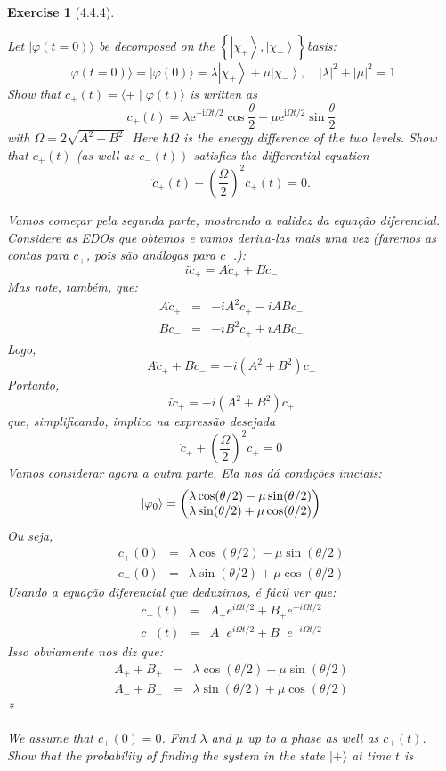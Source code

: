 \documentclass[12pt]{article}
\def\be{\begin{equation}}
\def\ee{\end{equation}}
\def\bea{\begin{eqnarray*}}
\def\eea{\end{eqnarray*}}
\def\f{\frac}
\def\l{\left}
\def\r{\right}
\newtheorem{exercise}{Exercise}
\begin{document}
\begin{exercise}[4.4.4]
\begin{exercises}
		\item Let $|\varphi(t=0)\rangle$ be decomposed on the $\left\{\left|\chi_{+}\right\rangle,\left|\chi_{-}\right\rangle\right\}$basis:
		$$
		|\varphi(t=0)\rangle=|\varphi(0)\rangle=\lambda\left|\chi_{+}\right\rangle+\mu\left|\chi_{-}\right\rangle, \quad|\lambda|^{2}+|\mu|^{2}=1
		$$
		Show that $c_{+}(t)=\langle+\mid \varphi(t)\rangle$ is written as
		$$
		c_{+}(t)=\lambda \mathrm{e}^{-\mathrm{i} \Omega t / 2} \cos \frac{\theta}{2}-\mu \mathrm{e}^{\mathrm{i} \Omega t / 2} \sin \frac{\theta}{2}
		$$
		with $\Omega=2 \sqrt{A^{2}+B^{2}}$. Here $\hbar \Omega$ is the energy difference of the two levels. Show that $c_{+}(t)$ (as well as $\left.c_{-}(t)\right)$ satisfies the differential equation
		$$
		\ddot{c}_{+}(t)+\left(\frac{\Omega}{2}\right)^{2} c_{+}(t)=0 .
		$$
		\begin{multianswer}
			Vamos começar pela segunda parte, mostrando a validez da equação diferencial. Considere as EDOs que obtemos e vamos deriva-las mais uma vez (faremos as contas para $c_+$, pois são análogas para $c_-$.):
			\be
				i\ddot{c}_+ = A\dot{c}_+ + B\dot{c}_-
			\ee
			Mas note, também, que:
			\bea
				A\dot{c}_+ &=& -iA^2c_+ - iABc_- \\
				B\dot{c}_- &=& -iB^2c_+ + iABc_-
			\eea
			Logo, 
			\be
				A\dot{c}_+ + B\dot{c}_- = -i(A^2+B^2)c_+
			\ee
			Portanto,
			\be
				i\ddot{c}_+ = -i(A^2+B^2)c_+
			\ee
			que, simplificando, implica na expressão desejada
			\be
				\ddot{c}_+ +\l(\f{\Omega}{2}\r)^2c_+ = 0
			\ee
			Vamos considerar agora a outra parte. Ela nos dá condições iniciais:
			\be
				\ket{\varphi_0} = 
				\begin{pmatrix}
					\lambda\cos(\theta/2) - \mu\sin(\theta/2) \\
					\lambda\sin(\theta/2) + \mu\cos(\theta/2) \\
				\end{pmatrix}
			\ee
			Ou seja,
			\bea
				c_+(0) &=& \lambda\cos(\theta/2) - \mu\sin(\theta/2) \\
				c_-(0) &=& \lambda\sin(\theta/2) + \mu\cos(\theta/2) 
			\eea
			Usando a equação diferencial que deduzimos, é fácil ver que:
			\bea
				c_+(t) &=& A_+e^{i\Omega t/2} + B_+e^{-i\Omega t/2} \\
				c_-(t) &=& A_-e^{i\Omega t/2} + B_-e^{-i\Omega t/2} 
			\eea
			Isso obviamente nos diz que:
			\bea
				A_+ + B_+ &=& \lambda\cos(\theta/2) - \mu\sin(\theta/2) \\
				A_- + B_- &=& \lambda\sin(\theta/2) + \mu\cos(\theta/2) 
			\eea
			*
		\end{multianswer}
		\item We assume that $c_{+}(0)=0$. Find $\lambda$ and $\mu$ up to a phase as well as $c_{+}(t)$. Show that the probability of finding the system in the state $|+\rangle$ at time $t$ is
		

\end{exercises}
\end{exercise}
\end{document}
